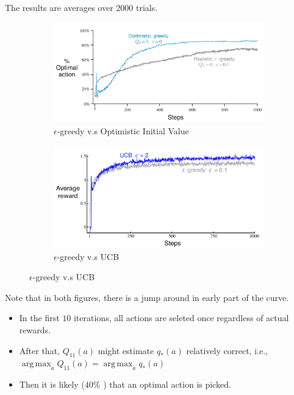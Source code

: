 \documentclass[10pt]{beamer}
\DeclareMathOperator*{\argmax}{arg\,max}
\theoremstyle{remark}
\begin{document}
\begin{frame}
    The results are averages over 2000 trials.
    \begin{figure}
        \begin{subfigure}{0.45\textwidth}
        \includegraphics[width=\textwidth]{figures/bandit_vs_1.png}
        \caption{$\epsilon$-greedy v.s Optimistic Initial Value}
        \end{subfigure}
        \begin{subfigure}{0.45\textwidth}
            \includegraphics[width=\textwidth]{figures/bandit_vs_2.png}
            \caption{$\epsilon$-greedy v.s UCB}
        \end{subfigure}
    \end{figure}
    Note that in both figures, there is a jump around in early part of the curve.
    \begin{itemize}
        \item In the first $10$ iterations, all actions are seleted once regardless of actual rewards.
        \item After that, $Q_{11}(a)$ might estimate $q_{\ast}(a)$ relatively correct, i.e., $\argmax_a Q_{11}(a) = \argmax_a q_{\ast}(a) $
        \item Then it is likely ($40\%$ ) that an optimal action is picked.
    \end{itemize}
\end{frame}
\end{document}
